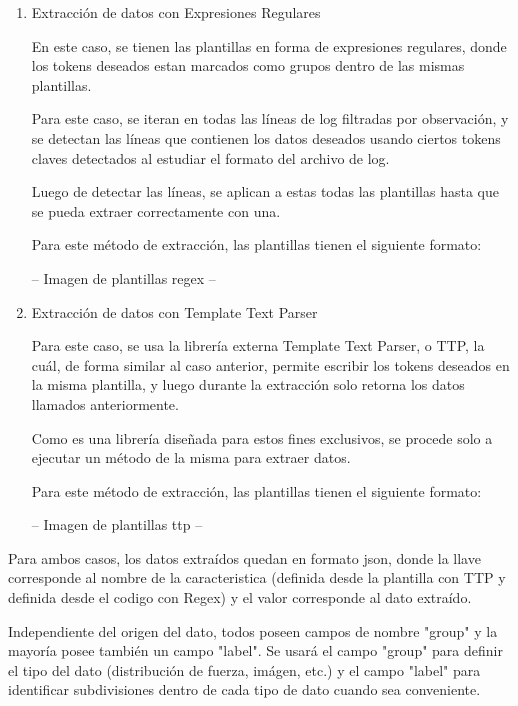 \begin{enumerate}

    \item{Extracción de datos con Expresiones Regulares}
    
    En este caso, se tienen las plantillas en forma de expresiones regulares, donde los tokens deseados estan marcados como grupos dentro de las mismas plantillas.

    Para este caso, se iteran en todas las líneas de log filtradas por observación, y se detectan las líneas que contienen los datos deseados usando ciertos tokens claves detectados al estudiar el formato del archivo de log.

    Luego de detectar las líneas, se aplican a estas todas las plantillas hasta que se pueda extraer correctamente con una.

    Para este método de extracción, las plantillas tienen el siguiente formato:

    -- Imagen de plantillas regex --

    \item{Extracción de datos con Template Text Parser}

    Para este caso, se usa la librería externa Template Text Parser, o TTP, la cuál, de forma similar al caso anterior, permite escribir los tokens deseados en la misma plantilla, y luego durante la extracción solo retorna los datos llamados anteriormente.

    Como es una librería diseñada para estos fines exclusivos, se procede solo a ejecutar un método de la misma para extraer datos.

    Para este método de extracción, las plantillas tienen el siguiente formato:

    -- Imagen de plantillas ttp --

\end{enumerate}

Para ambos casos, los datos extraídos quedan en formato json, donde la llave corresponde al nombre de la caracteristica (definida desde la plantilla con TTP y definida desde el codigo con Regex) y el valor corresponde al dato extraído.

Independiente del origen del dato, todos poseen campos de nombre "group" y la mayoría posee también un campo "label". Se usará el campo "group" para definir el tipo del dato (distribución de fuerza, imágen, etc.) y el campo "label" para identificar subdivisiones dentro de cada tipo de dato cuando sea conveniente.

